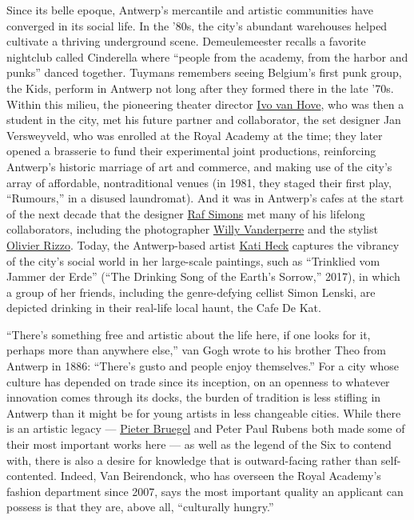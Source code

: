 Since its belle epoque, Antwerp's mercantile and artistic communities
have converged in its social life. In the '80s, the city's abundant
ware­houses helped cultivate a thriving underground scene.
Demeulemeester recalls a favorite nightclub called Cinderella where
``people from the academy, from the harbor and punks'' danced together.
Tuymans remembers seeing Belgium's first punk group, the Kids, perform
in Antwerp not long after they formed there in the late '70s. Within
this milieu, the pioneering theater director
\href{https://www.nytimes.com/2018/11/20/t-magazine/rufus-wainwright-ivo-van-hove-conversation.html}{Ivo
van Hove}, who was then a student in the city, met his future partner
and collaborator, the set designer Jan Versweyveld, who was enrolled at
the Royal Academy at the time; they later opened a brasserie to fund
their experimental joint productions, reinforcing Antwerp's historic
marriage of art and commerce, and making use of the city's array of
affordable, nontraditional venues (in 1981, they staged their first
play, ``Rumours,'' in a disused laundromat). And it was in Antwerp's
cafes at the start of the next decade that the designer
\href{https://www.nytimes.com/2016/03/06/t-magazine/raf-simons-interview.html}{Raf
Simons} met many of his lifelong collaborators, including the
photographer
\href{https://www.nytimes.com/2020/02/20/t-magazine/spring-fashion-cover.html}{Willy
Vanderperre} and the stylist
\href{https://www.nytimes.com/2019/08/05/t-magazine/fall-fashion-androgyny.html}{Olivier
Rizzo}. Today, the Antwerp-based artist
\href{https://www.saatchigallery.com/artists/kati_heck.htm}{Kati Heck}
captures the vibrancy of the city's social world in her large-scale
paintings, such as ``Trinklied vom Jammer der Erde'' (``The Drinking
Song of the Earth's Sorrow,'' 2017), in which a group of her friends,
including the genre-defying cellist Simon Lenski, are depicted drinking
in their real-life local haunt, the Cafe De Kat.

``There's something free and artistic about the life here, if one looks
for it, perhaps more than anywhere else,'' van Gogh wrote to his brother
Theo from Antwerp in 1886: ``There's gusto and people enjoy
themselves.'' For a city whose culture has depended on trade since its
inception, on an openness to whatever innovation comes through its
docks, the burden of tradition is less stifling in Antwerp than it might
be for young artists in less changeable cities. While there is an
artistic legacy ---
\href{https://www.nytimes.com/2018/11/23/arts/design/bruegel-kunsthistorisches-museum-technology-layers.html}{Pieter
Bruegel} and Peter Paul Rubens both made some of their most important
works here --- as well as the legend of the Six to contend with, there
is also a desire for knowledge that is outward-facing rather than
self-contented. Indeed, Van Beirendonck, who has overseen the Royal
Academy's fashion department since 2007, says the most important quality
an applicant can possess is that they are, above all, ``culturally
hungry.''

